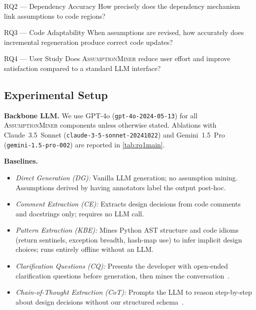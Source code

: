 \documentclass[sigconf,review,anonymous]{acmart}
\newcommand{\sysname}{\textsc{AssumptionMiner}\xspace}
\newcommand{\code}[1]{\texttt{#1}}
\begin{document}
\begin{rqbox}{RQ2 — Dependency Accuracy}
How precisely does the dependency mechanism link assumptions to code regions?
\end{rqbox}

\begin{rqbox}{RQ3 — Code Adaptability}
When assumptions are revised, how accurately does incremental regeneration
produce correct code updates?
\end{rqbox}

\begin{rqbox}{RQ4 — User Study}
Does \sysname reduce user effort and improve satisfaction compared to a standard
LLM interface?
\end{rqbox}

\subsection{Experimental Setup}
\label{sec:setup}

\textbf{Backbone LLM.}  We use GPT-4o (\code{gpt-4o-2024-05-13}) for all
\sysname components unless otherwise stated.  Ablations with Claude~3.5~Sonnet
(\code{claude-3-5-sonnet-20241022}) and Gemini~1.5~Pro (\code{gemini-1.5-pro-002})
are reported in \cref{tab:rq1main}.

\textbf{Baselines.}
\begin{itemize}[noitemsep]
  \item \textit{Direct Generation (DG):} Vanilla LLM generation; no assumption mining.
        Assumptions derived by having annotators label the output post-hoc.
  \item \textit{Comment Extraction (CE):} Extracts design decisions from
        code comments and docstrings only; requires no LLM call.
  \item \textit{Pattern Extraction (KBE):} Mines Python AST structure and code
        idioms (return sentinels, exception breadth, hash-map use) to infer implicit
        design choices; runs entirely offline without an LLM.
  \item \textit{Clarification Questions (CQ):} Presents the developer with
        open-ended clarification questions before generation, then mines the
        conversation~\cite{jiang2023selfplanning}.
  \item \textit{Chain-of-Thought Extraction (CoT):} Prompts the LLM to reason
        step-by-step about design decisions without our structured schema~\cite{wei2022cot}.
\end{itemize}
\end{document}
